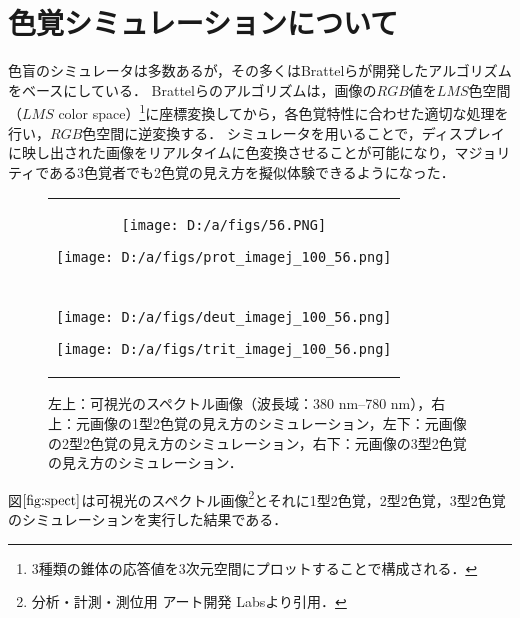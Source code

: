 \documentclass[uplatex,paper=a4,fontsize=4.0truemm,jafontsize=4.0truemm,head_space=30.0truemm,foot_space=30.0truemm,baselineskip=8.0truemm,line_length=40zw,gutter=25.0truemm,oneside,openany,fleqn,hanging_panctuation,open_bracket_pos=nibu_tentsuki,dvipdfmx,jis2004,book,titlepage]{jlreq}
\theoremstyle{mystyle}
\newcommand{\captiondot}[1]{\caption{#1．}}
\newcommand{\mathdisplaystyle}[1]{\(\displaystyle{#1}\)}
\newcommand{\Reference}[1]{\mathdisplaystyle{\ref{#1}}}
\begin{document}
		\section{色覚シミュレーションについて}
			色盲のシミュレータは多数あるが，その多くはBrattelらが開発したアルゴリズム\cite{Brettel1997}をベースにしている．
			Brattelらのアルゴリズムは，画像の\mathdisplaystyle{RGB}値を\mathdisplaystyle{LMS}色空間（\mathdisplaystyle{LMS} color space）\footnote{3種類の錐体の応答値を3次元空間にプロットすることで構成される．}に座標変換してから，各色覚特性に合わせた適切な処理を行い，\mathdisplaystyle{RGB}色空間に逆変換する．
			シミュレータを用いることで，ディスプレイに映し出された画像をリアルタイムに色変換させることが可能になり，マジョリティである3色覚者でも2色覚の見え方を擬似体験できるようになった．
			\begin{figure}[tbp]
				\centering
				\begin{tabular}{c}
					\begin{minipage}{0.5\linewidth}
						\centering
						\texttt{[image: D:/a/figs/56.PNG]}
					\end{minipage}
					\begin{minipage}{0.5\linewidth}
						\centering
						\texttt{[image: D:/a/figs/prot\_imagej\_100\_56.png]}
					\end{minipage} \\
					\begin{minipage}{0.06\linewidth}
						\vspace{10truemm}
					\end{minipage} \\
					\begin{minipage}{0.5\linewidth}
						\centering
						\texttt{[image: D:/a/figs/deut\_imagej\_100\_56.png]}
					\end{minipage}
					\begin{minipage}{0.5\linewidth}
						\centering
						\texttt{[image: D:/a/figs/trit\_imagej\_100\_56.png]}
					\end{minipage}
				\end{tabular}
				\captiondot{左上：可視光のスペクトル画像（波長域：380 nm--780 nm），右上：元画像の1型2色覚の見え方のシミュレーション，左下：元画像の2型2色覚の見え方のシミュレーション，右下：元画像の3型2色覚の見え方のシミュレーション}\label{fig:spect}
			\end{figure}
			図\Reference{fig:spect}は可視光のスペクトル画像\footnote{分析・計測・測位用 アート開発 Labs\protect\cite{Artlabs2019}より引用．}とそれに1型2色覚，2型2色覚，3型2色覚のシミュレーションを実行した結果である．
\end{document}
